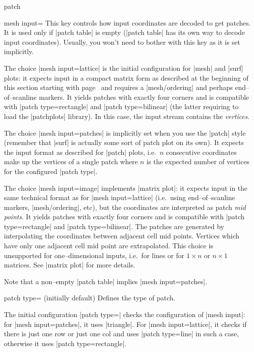{\begin{plottype}[/pgfplots]{patch}
\begin{pgfplotskey}{mesh input=}
	This key controls how input coordinates are decoded to get patches. It is used only if |patch table| is empty (|patch table| has its own way to decode input coordinates). Usually, you won't need to bother with this key as it is set implicitly.

	The choice |mesh input=lattice| is the initial configuration for |mesh| and |surf| plots: it expects input in a compact matrix form as described at the beginning of this section starting with page~\pageref{sec:3d} and requires a |mesh/ordering| and perhaps end--of--scanline markers. It yields patches with exactly four corners and is compatible with |patch type=rectangle| and |patch type=bilinear| (the latter requiring to load the |patchplots| library). In this case, the input stream contains the \emph{vertices}.

	The choice |mesh input=patches| is implicitly set when you use the |patch| style (remember that |surf| is actually some sort of patch plot on its own). It expects the input format as described for |patch| plots, i.e.\ $n$ consecutive coordinates make up the vertices of a single patch where $n$ is the expected number of vertices for the configured |patch type|. 

	The choice |mesh input=image| implements |matrix plot|: it expects input in the same technical format as for |mesh input=lattice| (i.e.\ using end--of--scanline markers, |mesh/ordering|, etc), but the coordinates are interpreted as patch \emph{mid points}. It yields patches with exactly four corners and is compatible with |patch type=rectangle| and |patch type=bilinear|. The patches are generated by interpolating the coordinates between adjacent cell mid points. Vertices which have only one adjacent cell mid point are extrapolated. This choice is unsupported for one--dimensional inputs, i.e.\ for lines or for $1\times n$ or $n \times 1$ matrices. See |matrix plot| for more details.

	Note that a non--empty |patch table| implies |mesh input=patches|.
\end{pgfplotskey}

\begin{pgfplotskey}{patch type= (initially default)}
\label{key:patch:type}
	Defines the type of patch. 

	The initial configuration |patch type=| checks the configuration of |mesh input|: for |mesh input=patches|, it uses |triangle|. For |mesh input=lattice|, it checks if there is just one row or just one col and uses |patch type=line| in such a case, otherwise it uses |patch type=rectangle|.


\end{pgfplotskey}
\end{plottype}}
